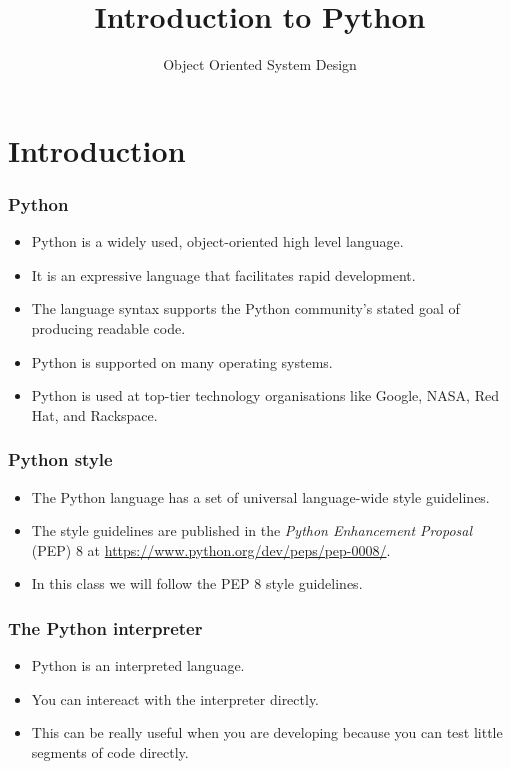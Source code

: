 \documentclass[10pt]{beamer}
\title{Introduction to Python}
\author[IN710]{Object Oriented System Design}
\institute[Otago Polytechnic]{
  Otago Polytechnic \\
  Dunedin, New Zealand \\
}
\date{}
\begin{document}
\begin{frame}[plain]
  \titlepage
\end{frame}

\section{Introduction}
\begin{frame}
  \frametitle{Python}

 \begin{itemize}
    \item Python is a widely used, object-oriented high level language.
    \item It is an expressive language that facilitates rapid development.
    \item The language syntax supports the Python community's stated goal
	    of producing readable code.
    \item Python is supported on many operating systems.
    \item Python is used at top-tier technology organisations like Google, NASA, Red Hat, 
	    and Rackspace.
  \end{itemize}
\end{frame}

\begin{frame}
	\frametitle{Python style}

	\begin{itemize}
		\item The Python language has a set of
			universal language-wide style guidelines.
		\item The style guidelines are published in the 
			\emph{Python Enhancement Proposal} (PEP) 8 at
			\url{https://www.python.org/dev/peps/pep-0008/}.
		\item In this class we will follow the PEP 8 style guidelines.
	\end{itemize}
\end{frame}

\begin{frame}
	\frametitle{The Python interpreter}
	\begin{itemize}
		\item Python is an interpreted language.
		\item You can intereact with the interpreter directly.
		\item This can be really useful when you are developing because you 
			can test little segments of code directly.
	\end{itemize}
\end{frame}
\end{document}
